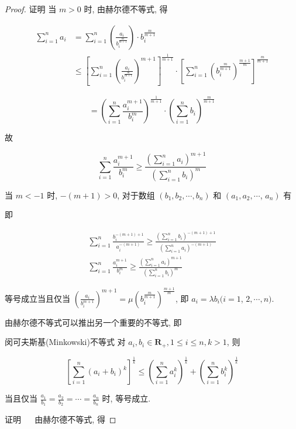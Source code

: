 \begin{proof}
	证明 当 $m>0$ 时, 由赫尔德不等式, 得
	
	$$
	\begin{aligned}
	\sum_{i=1}^{n} a_{i} & =\sum_{i=1}^{n}\left(\frac{a_{i}}{b_{i}^{\frac{m}{m+1}}}\right) \cdot b_{i}^{\frac{m}{m+1}} \\
	& \leqslant\left[\sum_{i=1}^{n}\left(\frac{a_{i}}{b_{i}^{\frac{m}{m+1}}}\right)^{m+1}\right]^{\frac{1}{m+1}} \cdot\left[\sum_{i=1}^{n}\left(b_{i}^{\frac{m}{m+1}}\right)^{\frac{m+1}{m}}\right]^{\frac{m}{m+1}}
	\end{aligned}
	$$
	
	$$
	=\left(\sum_{i=1}^{n} \frac{a_{i}^{m+1}}{b_{i}^{m}}\right)^{\frac{1}{m+1}} \cdot\left(\sum_{i=1}^{n} b_{i}\right)^{\frac{m}{m+1}}
	$$
	
	故
	
	$$
	\sum_{i=1}^{n} \frac{a_{i}^{m+1}}{b_{i}^{m}} \geqslant \frac{\left(\sum_{i=1}^{n} a_{i}\right)^{m+1}}{\left(\sum_{i=1}^{n} b_{i}\right)^{m}}
	$$
	
	当 $m<-1$ 时, $-(m+1)>0$, 对于数组 $\left(b_{1}, b_{2}, \cdots, b_{n}\right)$ 和 $\left(a_{1}, a_{2}, \cdots\right.$, $\left.a_{n}\right)$ 有
	
	即
	
	$$
	\begin{gathered}
	\sum_{i=1}^{n} \frac{b_{i}^{-(m+1)+1}}{a_{i}^{-(m+1)}} \geqslant \frac{\left(\sum_{i=1}^{n} b_{i}\right)^{-(m+1)+1}}{\left(\sum_{i=1}^{n} a_{i}\right)^{-(m+1)}} \\
	\sum_{i=1}^{n} \frac{a_{i}^{m+1}}{b_{i}^{m}} \geqslant \frac{\left(\sum_{i=1}^{n} a_{i}\right)^{m+1}}{\left(\sum_{i=1}^{n} b_{i}\right)^{m}}
	\end{gathered}
	$$
	
	等号成立当且仅当 $\left(\frac{a_{i}}{b_{i}^{m+1}}\right)^{m+1}=\mu\left(b_{i}^{\frac{m}{m+1}}\right)^{\frac{m+1}{m}}$, 即 $a_{i}=\lambda b_{i}(i=1$, $2, \cdots, n)$.
	
	由赫尔德不等式可以推出另一个重要的不等式, 即
	
	闵可夫斯基(Minkowski)不等式 对 $a_{i}, b_{i} \in \mathbf{R}_{+}, 1 \leqslant i \leqslant n, k>1$, 则
	
	$$
	\left[\sum_{i=1}^{n}\left(a_{i}+b_{i}\right)^{k}\right]^{\frac{1}{k}} \leqslant\left(\sum_{i=1}^{n} a_{i}^{k}\right)^{\frac{1}{k}}+\left(\sum_{i=1}^{n} b_{i}^{k}\right)^{\frac{1}{k}}
	$$
	
	当且仅当 $\frac{a_{1}}{b_{1}}=\frac{a_{2}}{b_{2}}=\cdots=\frac{a_{n}}{b_{n}}$ 时, 等号成立.
	
	证明 $\quad$ 由赫尔德不等式, 得
	

\end{proof}
